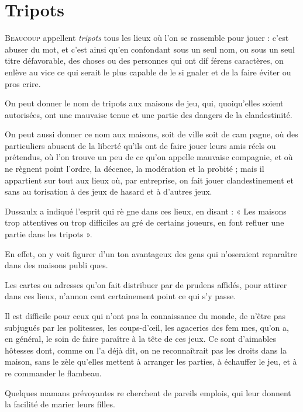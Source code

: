 \chapter{Tripots}


\lettrine{B}{eaucoup} appellent \emph{tripots} tous les
lieux où l'on se rassemble pour jouer :
c'est abuser du mot, et c'est ainsi 
qu'en confondant sous un seul nom,
ou sous un seul titre défavorable, des
choses ou des personnes qui ont dif%
férens caractères, on enlève au vice
ce qui serait le plus capable de le si%
gnaler et de la faire éviter ou pros%
crire.

On peut donner le nom de tripots
aux maisons de jeu, qui, quoiqu'elles
soient autorisées, ont une mauvaise
tenue et une partie des dangers de la
clandestinité.

On peut aussi donner ce nom aux
maisons, soit de ville soit de cam%
pagne, où des particuliers abusent de
la liberté qu'ils ont de faire jouer leurs
amis réels ou prétendus, où l'on trouve
un peu de ce qu'on appelle mauvaise
compagnie, et où ne règnent point
l'ordre, la décence, la modération et
la probité ; mais il appartient sur%
tout aux lieux où, par entreprise, on
fait jouer clandestinement et sans au%
torisation à des jeux de hasard et à
d'autres jeux.

Dussaulx a indiqué l'esprit qui rè%
gne dans ces lieux, en disant : « Les
maisons trop attentives ou trop
difficiles au gré de certains joueurs,
en font refluer une partie dans les
tripots ».

En effet, on y voit figurer d'un ton
avantageux des gens qui n'oseraient
reparaître dans des maisons publi%
ques.

Les cartes ou adresses qu'on fait
distribuer par de prudens affidés,
pour attirer dans ces lieux, n'annon%
cent certainement point ce qui s'y 
passe.

Il est difficile pour ceux qui n'ont
pas la connaissance du monde, de
n'être pas subjugués par les politesses,
les coups-d'{\oe}il, les agaceries des fem%
mes, qu'on a, en général, le soin de
faire paraître à la tête de ces jeux. Ce
sont d'aimables hôtesses dont, comme
on l'a déjà dit, on ne reconnaîtrait
pas les droits dans la maison, sans le
zèle qu'elles mettent à arranger les
parties, à échauffer le jeu, et à re%
commander le flambeau.

Quelques mamans prévoyantes re%
cherchent de pareils emplois, qui 
leur donnent la facilité de marier
leurs filles.

